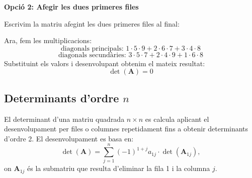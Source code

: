 \documentclass[12pt]{article}
\newcommand{\mat}[1]{\mathbf{#1}}
\begin{document}
\begin{exemple}
\textbf{Opció 2: Afegir les dues primeres files}

Escrivim la matriu afegint les dues primeres files al final:

Ara, fem les multiplicacions:
\[
\text{diagonals principals: } 1\cdot5\cdot9 + 2\cdot6\cdot7 + 3\cdot4\cdot8
\]
\[
\text{diagonals secundàries: } 3\cdot5\cdot7 + 2\cdot4\cdot9 + 1\cdot6\cdot8
\]
Substituint els valors i desenvolupant obtenim el mateix resultat:
\[
\det(\mat{A}) = 0
\]
\end{exemple}

\subsection{\texorpdfstring{Determinants d'ordre $n$}{Determinants d'ordre n}}
\begin{concept}
El determinant d'una matriu quadrada $n \times n$ es calcula aplicant el desenvolupament per files o columnes repetidament fins a obtenir determinants d'ordre 2. El desenvolupament es basa en:
\[
\det(\mat{A}) = \sum_{j=1}^n (-1)^{1+j} a_{1j} \cdot \det(\mat{A}_{1j}),
\]
on $\mat{A}_{1j}$ és la submatriu que resulta d'eliminar la fila 1 i la columna $j$.
\end{concept}
\end{document}
